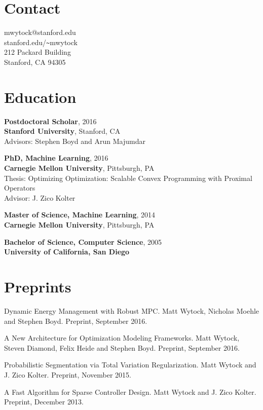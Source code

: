\documentclass[margin, line]{res}
\begin{document}
\renewcommand{\namefont}{\Huge\bf}


\begin{resume}
\section{Contact}
mwytock@stanford.edu \\
stanford.edu/\verb+~+mwytock \\
212 Packard Building \\
Stanford, CA 94305

\section{Education}

{\bf Postdoctoral Scholar}, 2016 \\
{\bf Stanford University}, Stanford, CA \\
Advisors: Stephen Boyd and Arun Majumdar

{\bf PhD, Machine Learning}, 2016 \\
{\bf Carnegie Mellon University}, Pittsburgh, PA \\
Thesis: Optimizing Optimization: Scalable Convex Programming with Proximal Operators \\
Advisor: J. Zico Kolter

{\bf Master of Science, Machine Learning}, 2014 \\
{\bf Carnegie Mellon University}, Pittsburgh, PA

{\bf Bachelor of Science, Computer Science}, 2005 \\
{\bf University of California, San Diego}

\section{Preprints}

Dynamic Energy Management with Robust MPC. Matt Wytock, Nicholas Moehle and
Stephen Boyd. Preprint, September 2016.

A New Architecture for Optimization Modeling Frameworks. Matt Wytock, Steven
Diamond, Felix Heide and Stephen Boyd. Preprint, September 2016.

Probabilistic Segmentation via Total Variation Regularization. Matt Wytock and
J. Zico Kolter. Preprint, November 2015.

A Fast Algorithm for Sparse Controller Design. Matt Wytock and J. Zico
Kolter. Preprint, December 2013.


\end{resume}
\end{document}
